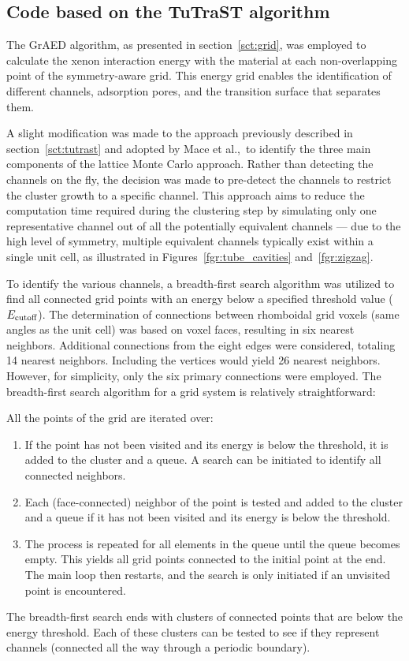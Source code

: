 \documentclass[main]{subfiles}
\begin{document}
\subsection{Code based on the TuTraST algorithm}

The GrAED algorithm, as presented in section~\ref{sct:grid}, was employed to calculate the xenon interaction energy with the material at each non-overlapping point of the symmetry-aware grid. This energy grid enables the identification of different channels, adsorption pores, and the transition surface that separates them.

A slight modification was made to the approach previously described in section~\ref{sct:tutrast} and adopted by Mace et al.,\ to identify the three main components of the lattice Monte Carlo approach. Rather than detecting the channels on the fly, the decision was made to pre-detect the channels to restrict the cluster growth to a specific channel. This approach aims to reduce the computation time required during the clustering step by simulating only one representative channel out of all the potentially equivalent channels --- due to the high level of symmetry, multiple equivalent channels typically exist within a single unit cell, as illustrated in Figures~\ref{fgr:tube_cavities} and~\ref{fgr:zigzag}.

To identify the various channels, a breadth-first search algorithm was utilized to find all connected grid points with an energy below a specified threshold value ($E_{\text{cutoff}}$). The determination of connections between rhomboidal grid voxels (same angles as the unit cell) was based on voxel faces, resulting in six nearest neighbors. Additional connections from the eight edges were considered, totaling 14 nearest neighbors. Including the vertices would yield 26 nearest neighbors. However, for simplicity, only the six primary connections were employed. The breadth-first search algorithm for a grid system is relatively straightforward:

All the points of the grid are iterated over:
  \begin{enumerate}
    \item If the point has not been visited and its energy is below the threshold, it is added to the cluster and a queue. A search can be initiated to identify all connected neighbors.
    \item Each (face-connected) neighbor of the point is tested and added to the cluster and a queue if it has not been visited and its energy is below the threshold.
    \item The process is repeated for all elements in the queue until the queue becomes empty. This yields all grid points connected to the initial point at the end. The main loop then restarts, and the search is only initiated if an unvisited point is encountered.
  \end{enumerate}
The breadth-first search ends with clusters of connected points that are below the energy threshold. Each of these clusters can be tested to see if they represent channels (connected all the way through a periodic boundary).
\end{document}

